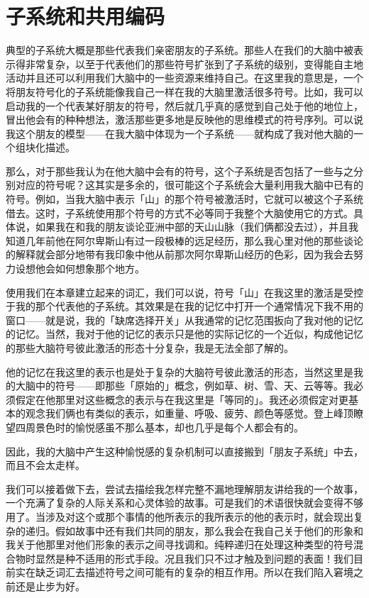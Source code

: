 \documentclass[
  12pt,
  twoside,
  openright,
  oldfontcommands,
]{memoir}
\begin{document}
\section{子系统和共用编码}

典型的子系统大概是那些代表我们亲密朋友的子系统。那些人在我们的大脑中被表示得非常复杂，以至于代表他们的那些符号扩张到了子系统的级别，变得能自主地活动并且还可以利用我们大脑中的一些资源来维持自己。在这里我的意思是，一个将朋友符号化的子系统能像我自己一样在我的大脑里激活很多符号。比如，我可以启动我的一个代表某好朋友的符号，然后就几乎真的感觉到自己处于他的地位上，冒出他会有的种种想法，激活那些更多地是反映他的思维模式的符号序列。可以说我这个朋友的模型------在我大脑中体现为一个子系统------就构成了我对他大脑的一个组块化描述。

那么，对于那些我认为在他大脑中会有的符号，这个子系统是否包括了一些与之分别对应的符号呢？这其实是多余的，很可能这个子系统会大量利用我大脑中已有的符号。例如，当我大脑中表示「山」的那个符号被激活时，它就可以被这个子系统借去。这时，子系统使用那个符号的方式不必等同于我整个大脑使用它的方式。具体说，如果我在和我的朋友谈论亚洲中部的天山山脉（我们俩都没去过），并且我知道几年前他在阿尔卑斯山有过一段极棒的远足经历，那么我心里对他的那些谈论的解释就会部分地带有我印象中他从前那次阿尔卑斯山经历的色彩，因为我会去努力设想他会如何想象那个地方。

使用我们在本章建立起来的词汇，我们可以说，符号「山」在我这里的激活是受控于我的那个代表他的子系统。其效果是在我的记忆中打开一个通常情况下我不用的窗口------就是说，我的「缺席选择开关」从我通常的记忆范围扳向了我对他的记忆的记忆。当然，我对于他的记忆的表示只是他的实际记忆的一个近似，构成他记忆的那些大脑符号彼此激活的形态十分复杂，我是无法全部了解的。

他的记忆在我这里的表示也是处于复杂的大脑符号彼此激活的形态，当然这里是我的大脑中的符号------即那些「原始的」概念，例如草、树、雪、天、云等等。我必须假定在他那里对这些概念的表示与在我这里是「等同的」。我还必须假定对更基本的观念我们俩也有类似的表示，如重量、呼吸、疲劳、颜色等感觉。登上峰顶瞭望四周景色时的愉悦感虽不那么基本，却也几乎是每个人都会有的。

因此，我的大脑中产生这种愉悦感的复杂机制可以直接搬到「朋友子系统」中去，而且不会太走样。

我们可以接着做下去，尝试去描绘我怎样完整不漏地理解朋友讲给我的一个故事，一个充满了复杂的人际关系和心灵体验的故事。可是我们的术语很快就会变得不够用了。当涉及对这个或那个事情的他所表示的我所表示的他的表示时，就会现出复杂的递归。假如故事中还有我们共同的朋友，那么我会在我自己关于他们的形象和我关于他那里对他们形象的表示之间寻找调和。纯粹递归在处理这种类型的符号混合物时显然是种不适用的形式手段。况且我们只不过才触及到问题的表面！我们目前实在缺乏词汇去描述符号之间可能有的复杂的相互作用。所以在我们陷入窘境之前还是止步为好。
\end{document}
